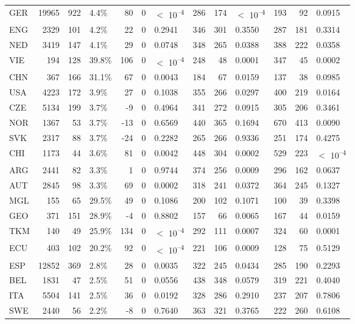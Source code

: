 \begin{tabular}[t]{lrrlrrlrrlrrl}
GER & 19965 & 922 & 4.4\% & 80 & 0 & $<$ 10\textsuperscript{--4} & 286 & 174 & $<$ 10\textsuperscript{--4} & 193 & 92 & 0.0915\\
ENG & 2329 & 101 & 4.2\% & 22 & 0 & 0.2941 & 346 & 301 & 0.3550 & 287 & 181 & 0.3314\\
NED & 3419 & 147 & 4.1\% & 29 & 0 & 0.0748 & 348 & 265 & 0.0388 & 388 & 222 & 0.0358\\
VIE & 194 & 128 & 39.8\% & 106 & 0 & $<$ 10\textsuperscript{--4} & 248 & 48 & 0.0001 & 347 & 45 & 0.0002\\
CHN & 367 & 166 & 31.1\% & 67 & 0 & 0.0043 & 184 & 67 & 0.0159 & 137 & 38 & 0.0985\\
USA & 4223 & 172 & 3.9\% & 27 & 0 & 0.1038 & 355 & 266 & 0.0297 & 400 & 219 & 0.0164\\
CZE & 5134 & 199 & 3.7\% & -9 & 0 & 0.4964 & 341 & 272 & 0.0915 & 305 & 206 & 0.3461\\
NOR & 1367 & 53 & 3.7\% & -13 & 0 & 0.6569 & 440 & 365 & 0.1694 & 670 & 413 & 0.0090\\
SVK & 2317 & 88 & 3.7\% & -24 & 0 & 0.2282 & 265 & 266 & 0.9336 & 251 & 174 & 0.4275\\
CHI & 1173 & 44 & 3.6\% & 81 & 0 & 0.0042 & 448 & 304 & 0.0002 & 529 & 223 & $<$ 10\textsuperscript{--4}\\
ARG & 2441 & 82 & 3.3\% & 1 & 0 & 0.9744 & 374 & 256 & 0.0009 & 296 & 162 & 0.0637\\
AUT & 2845 & 98 & 3.3\% & 69 & 0 & 0.0002 & 318 & 241 & 0.0372 & 364 & 245 & 0.1327\\
MGL & 155 & 65 & 29.5\% & 49 & 0 & 0.1086 & 200 & 102 & 0.1071 & 100 & 39 & 0.3398\\
GEO & 371 & 151 & 28.9\% & -4 & 0 & 0.8802 & 157 & 66 & 0.0065 & 167 & 44 & 0.0159\\
TKM & 140 & 49 & 25.9\% & 134 & 0 & $<$ 10\textsuperscript{--4} & 292 & 111 & 0.0007 & 324 & 60 & 0.0001\\
ECU & 403 & 102 & 20.2\% & 92 & 0 & $<$ 10\textsuperscript{--4} & 221 & 106 & 0.0009 & 128 & 75 & 0.5129\\
ESP & 12852 & 369 & 2.8\% & 28 & 0 & 0.0035 & 322 & 245 & 0.0434 & 285 & 190 & 0.2293\\
BEL & 1831 & 47 & 2.5\% & 51 & 0 & 0.0556 & 438 & 348 & 0.0579 & 319 & 221 & 0.4040\\
ITA & 5504 & 141 & 2.5\% & 36 & 0 & 0.0192 & 328 & 286 & 0.2910 & 237 & 207 & 0.7806\\
SWE & 2440 & 56 & 2.2\% & -8 & 0 & 0.7640 & 363 & 321 & 0.3765 & 222 & 260 & 0.6108\\

\end{tabular}
